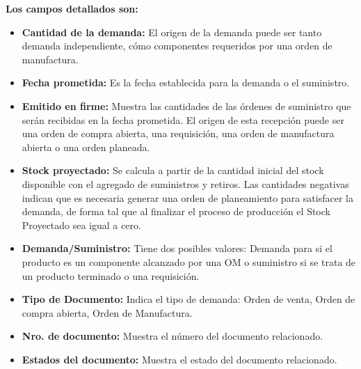 \documentclass[letterpaper,10pt,spanish]{sphinxmanual}
\begin{document}
\textbf{Los campos detallados son:}
\begin{itemize}
\item {} 
\textbf{Cantidad de la demanda:} El origen de la demanda puede ser tanto demanda independiente, cómo componentes requeridos por una orden de manufactura.

\item {} 
\textbf{Fecha prometida:} Es la fecha establecida para la demanda o el suministro.

\item {} 
\textbf{Emitido en firme:} Muestra las cantidades de las órdenes de suministro que serán recibidas en la fecha prometida. El origen de esta recepción puede ser una orden de compra abierta, una requisición, una orden de manufactura abierta o una orden planeada.

\item {} 
\textbf{Stock proyectado:} Se calcula a partir de la cantidad inicial del stock disponible con el agregado de suministros y retiros. Las cantidades negativas indican que es necesaria generar una orden de planeamiento para satisfacer la demanda, de forma tal que al finalizar el proceso de producción el Stock Proyectado sea igual a cero.

\item {} 
\textbf{Demanda/Suministro:} Tiene dos posibles valores: Demanda para si el producto es un componente alcanzado por una OM o suministro si se trata de un producto terminado o una requisición.

\item {} 
\textbf{Tipo de Documento:} Indica el tipo de demanda: Orden de venta, Orden de compra abierta, Orden de Manufactura.

\item {} 
\textbf{Nro. de documento:} Muestra el número del documento relacionado.

\item {} 
\textbf{Estados del documento:} Muestra el estado del documento relacionado.

\end{itemize}
\end{document}
